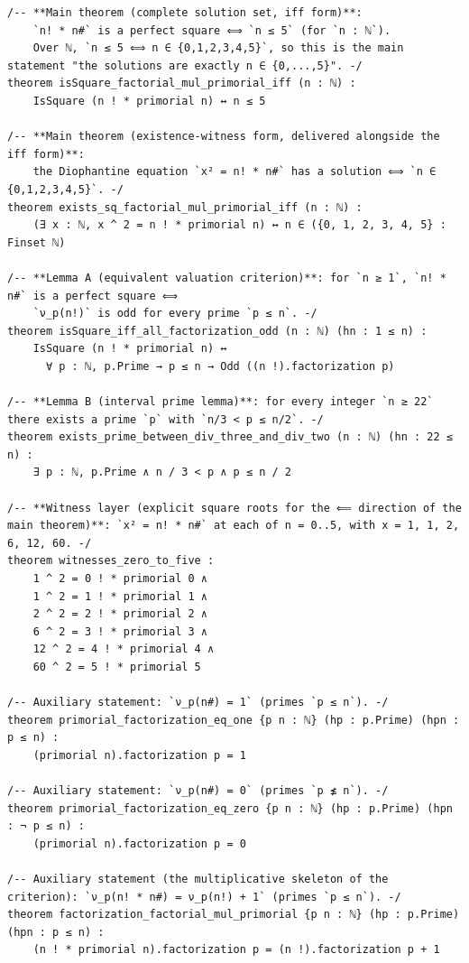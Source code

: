 \documentclass[11pt]{article}
\theoremstyle{definition}
\begin{document}
\begin{lstlisting}[caption={Frozen statement snapshot (Lean 4): the complete
frozen set, copied from the \texttt{lean} fence of the snapshot shipped as
\texttt{proofs/nfact-primorial-square.statement.txt} (a comment-cleaned
edition: docstrings translated to English for publication; the statement
text is byte-identical to the frozen snapshot of record, sha256
\texttt{0b13d08d}; correspondence record
\texttt{audit/comment-cleanup-diff.md}).},label={lst:stmt}]
/-- **Main theorem (complete solution set, iff form)**:
    `n! * n#` is a perfect square ⟺ `n ≤ 5` (for `n : ℕ`).
    Over ℕ, `n ≤ 5 ⟺ n ∈ {0,1,2,3,4,5}`, so this is the main statement "the solutions are exactly n ∈ {0,...,5}". -/
theorem isSquare_factorial_mul_primorial_iff (n : ℕ) :
    IsSquare (n ! * primorial n) ↔ n ≤ 5

/-- **Main theorem (existence-witness form, delivered alongside the iff form)**:
    the Diophantine equation `x² = n! * n#` has a solution ⟺ `n ∈ {0,1,2,3,4,5}`. -/
theorem exists_sq_factorial_mul_primorial_iff (n : ℕ) :
    (∃ x : ℕ, x ^ 2 = n ! * primorial n) ↔ n ∈ ({0, 1, 2, 3, 4, 5} : Finset ℕ)

/-- **Lemma A (equivalent valuation criterion)**: for `n ≥ 1`, `n! * n#` is a perfect square ⟺
    `ν_p(n!)` is odd for every prime `p ≤ n`. -/
theorem isSquare_iff_all_factorization_odd (n : ℕ) (hn : 1 ≤ n) :
    IsSquare (n ! * primorial n) ↔
      ∀ p : ℕ, p.Prime → p ≤ n → Odd ((n !).factorization p)

/-- **Lemma B (interval prime lemma)**: for every integer `n ≥ 22` there exists a prime `p` with `n/3 < p ≤ n/2`. -/
theorem exists_prime_between_div_three_and_div_two (n : ℕ) (hn : 22 ≤ n) :
    ∃ p : ℕ, p.Prime ∧ n / 3 < p ∧ p ≤ n / 2

/-- **Witness layer (explicit square roots for the ⟸ direction of the main theorem)**: `x² = n! * n#` at each of n = 0..5, with x = 1, 1, 2, 6, 12, 60. -/
theorem witnesses_zero_to_five :
    1 ^ 2 = 0 ! * primorial 0 ∧
    1 ^ 2 = 1 ! * primorial 1 ∧
    2 ^ 2 = 2 ! * primorial 2 ∧
    6 ^ 2 = 3 ! * primorial 3 ∧
    12 ^ 2 = 4 ! * primorial 4 ∧
    60 ^ 2 = 5 ! * primorial 5

/-- Auxiliary statement: `ν_p(n#) = 1` (primes `p ≤ n`). -/
theorem primorial_factorization_eq_one {p n : ℕ} (hp : p.Prime) (hpn : p ≤ n) :
    (primorial n).factorization p = 1

/-- Auxiliary statement: `ν_p(n#) = 0` (primes `p ≰ n`). -/
theorem primorial_factorization_eq_zero {p n : ℕ} (hp : p.Prime) (hpn : ¬ p ≤ n) :
    (primorial n).factorization p = 0

/-- Auxiliary statement (the multiplicative skeleton of the criterion): `ν_p(n! * n#) = ν_p(n!) + 1` (primes `p ≤ n`). -/
theorem factorization_factorial_mul_primorial {p n : ℕ} (hp : p.Prime) (hpn : p ≤ n) :
    (n ! * primorial n).factorization p = (n !).factorization p + 1
\end{lstlisting}
\end{document}
